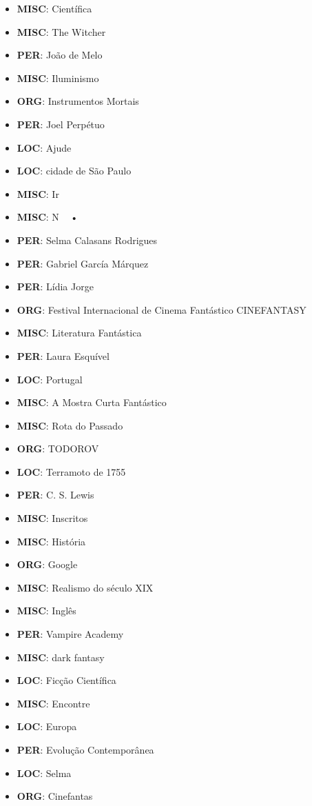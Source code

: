 \documentclass{article}
\begin{document}
\begin{itemize}
\item \textbf{MISC}: Científica
\item \textbf{MISC}: The Witcher
\item \textbf{PER}: João de Melo
\item \textbf{MISC}: Iluminismo
\item \textbf{ORG}: Instrumentos Mortais
\item \textbf{PER}: Joel Perpétuo
\item \textbf{LOC}: Ajude
\item \textbf{LOC}: cidade de São Paulo
\item \textbf{MISC}: Ir
\item \textbf{MISC}: N   • 
\item \textbf{PER}: Selma Calasans Rodrigues
\item \textbf{PER}: Gabriel García Márquez
\item \textbf{PER}: Lídia Jorge
\item \textbf{ORG}: Festival Internacional de Cinema Fantástico CINEFANTASY
\item \textbf{MISC}: Literatura Fantástica
\item \textbf{PER}: Laura Esquível
\item \textbf{LOC}: Portugal
\item \textbf{MISC}: A Mostra Curta Fantástico
\item \textbf{MISC}: Rota do Passado
\item \textbf{ORG}: TODOROV
\item \textbf{LOC}: Terramoto de 1755
\item \textbf{PER}: C. S. Lewis
\item \textbf{MISC}: Inscritos
\item \textbf{MISC}: História
\item \textbf{ORG}: Google
\item \textbf{MISC}: Realismo do século XIX
\item \textbf{MISC}: Inglês
\item \textbf{PER}: Vampire Academy
\item \textbf{MISC}: dark fantasy
\item \textbf{LOC}: Ficção Científica
\item \textbf{MISC}: Encontre
\item \textbf{LOC}: Europa
\item \textbf{PER}: Evolução Contemporânea
\item \textbf{LOC}: Selma
\item \textbf{ORG}: Cinefantas

\end{itemize}
\end{document}
